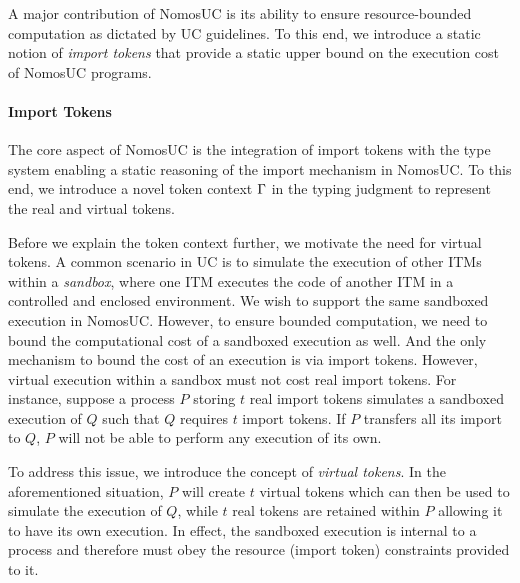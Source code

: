 A major contribution of NomosUC is its ability to ensure resource-bounded computation
as dictated by UC guidelines.
To this end, we introduce a static notion of \emph{import tokens} that provide a static upper
bound on the execution cost of NomosUC programs.

\paragraph*{\textbf{Import Tokens}}
The core aspect of NomosUC is the integration of import tokens with the type system
enabling a static reasoning of the import mechanism in NomosUC.
To this end, we introduce a novel token context $\Gamma$ in the typing judgment to
represent the real and virtual tokens.

Before we explain the token context further, we motivate the need for virtual tokens.
A common scenario in UC is to simulate the execution of other ITMs within a \emph{sandbox},
where one ITM executes the code of another ITM in a controlled and enclosed environment.
We wish to support the same sandboxed execution in NomosUC.
However, to ensure bounded computation, we need to bound the computational cost of a
sandboxed execution as well.
And the only mechanism to bound the cost of an execution is via import tokens.
However, virtual execution within a sandbox must not cost real import tokens.
For instance, suppose a process $P$ storing $t$ real import tokens
simulates a sandboxed execution of $Q$ such that $Q$ requires $t$
import tokens.
If $P$ transfers all its import to $Q$, $P$ will not be able to perform any execution of its own.

To address this issue, we introduce the concept of \emph{virtual tokens}.
In the aforementioned situation, $P$ will create $t$ virtual tokens
which can then be used to simulate the execution of $Q$, while $t$ real tokens are retained within $P$
allowing it to have its own execution.
In effect, the sandboxed execution is internal to a process and therefore must obey the resource (import token)
constraints provided to it.

